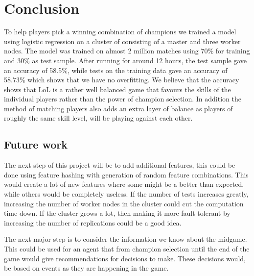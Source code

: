 \section{Conclusion}\label{sec:conclusion}
To help players pick a winning combination of champions we trained a model using logistic regression on a cluster of consisting of a master and three worker nodes. The model was trained on almost 2 million matches using 70\% for training and 30\% as test sample. After running for around 12 hours, the test sample gave an accuracy of 58.5\%, while tests on the training data gave an accuracy of 58.73\% which shows that we have no overfitting. We believe that the accuracy shows that LoL is a rather well balanced game that favours the skills of the individual players rather than the power of champion selection. In addition the method of matching players also adds an extra layer of balance as players of roughly the same skill level, will be playing against each other. 

\subsection{Future work}\label{sec:futurework}
The next step of this project will be to add additional features, this could be done using feature hashing with generation of random feature combinations. This would create a lot of new features where some might be a better than expected, while others would be completely useless.
If the number of tests increases greatly, increasing the number of worker nodes in the cluster could cut the computation time down. If the cluster grows a lot, then making it more fault tolerant by increasing the number of replications could be a good idea.

The next major step is to consider the information we know about the midgame. This could be used for an agent that from champion selection until the end of the game would give recommendations for decisions to make. These decisions would, be based on events as they are happening in the game.




